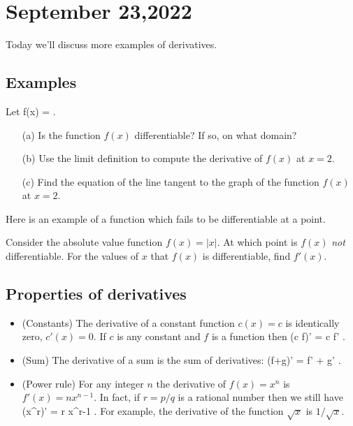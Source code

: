 \documentclass[11pt]{amsart}
\begin{document}
\newpage

\section{September 23,2022}

Today we'll discuss more examples of derivatives. 

\subsection*{Examples}

\begin{eg}
Let 
\beqn
f(x) =  .
\eeqn
\begin{itemize}
\item[(a)] Is the function $f(x)$ differentiable? If so, on what domain?
\item[(b)]
Use the limit definition to compute the derivative of $f(x)$ at $x=2$.
\item[(c)] 
Find the equation of the line tangent to the graph of the function $f(x)$ at $x=2$.
\end{itemize}
\end{eg}

\newpage

Here is an example of a function which fails to be differentiable at a point.

\begin{eg} Consider the absolute value function $f(x) = |x|$. 
At which point is $f(x)$ {\em not} differentiable. 
For the values of $x$ that $f(x)$ is differentiable, find $f'(x)$. 
\end{eg}

\vspace{3cm}

\subsection*{Properties of derivatives}

\begin{itemize}
\item (Constants) The derivative of a constant function $c(x) = c$ is identically zero, $c'(x) = 0$. 
If $c$ is any constant and $f$ is a function then
\beqn
(c f)' = c f' .
\eeqn
\item (Sum) The derivative of a sum is the sum of derivatives:
\beqn
(f+g)' = f' + g' .
\eeqn
\item (Power rule) For any integer $n$ the derivative of $f(x) = x^n$ is $f'(x) = n x^{n-1}$. 
In fact, if $r = p/q$ is a rational number then we still have
\beqn
(x^r)' = r x^{r-1} .
\eeqn
For example, the derivative of the function $\sqrt{x}$ is $1 / \sqrt{x}$.
\end{itemize}
\end{document}
